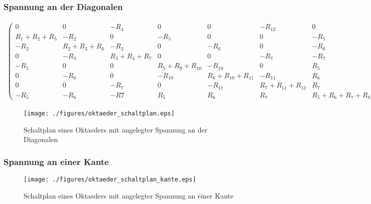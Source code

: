 \documentclass[10pt,a4paper]{article}
\begin{document}
\begin{landscape}
\subsubsection{Spannung an der Diagonalen}
\begin{align}
\begin{pmatrix}
	0 & 0 & -R_4 & 0 & 0 & -R_{12} & 0 & R_4 + R_{12} \\
	R_1 + R_2 + R_5 & -R_2 & 0 & -R_5 & 0 & 0 &-R_5 & 0 \\
	-R_2 & R_2 + R_3 + R_6 & -R_3 & 0 & -R_6 & 0 & -R_6 & 0 \\
	0 & -R_3 & R_3 + R_4 + R_7 & 0 & 0 & -R_7 & -R_7 & -R_4 \\
	-R_5 & 0 & 0 & R_5 + R_9 + R_{10} & -R_{10} & 0 & R_5 & 0 \\
	0 & -R_6 & 0 & -R_{10} & R_6 + R_{10} + R_{11} & -R_{11} & R_6 & 0 \\
	0 & 0 & -R_7 & 0 & -R_{11} & R_7 + R_{11} + R_{12} & R_7 & -R_{12} \\
	-R_5 & -R_6 & -R7 & R_5 & R_6 & R_7 & R_5 + R_6 + R_7 + R_8 & 0
\end{pmatrix}
\begin{pmatrix}
I_1\\ I_2\\ I_3\\I_4\\I_5\\I_6\\I_7\\I_{ges}
\end{pmatrix}
=
\begin{pmatrix}
U\\0\\0\\0\\0\\0\\0\\0
\end{pmatrix}
\label{eqn:oktaeder_ganz}
\end{align}
\begin{figure}[htbp!]
\centering
\texttt{[image: ./figures/oktaeder\_schaltplan.eps]}
\caption{Schaltplan eines Oktaeders mit angelegter Spannung an der Diagonalen}
\label{fig:oktaeder_schaltplan}
\end{figure}
\thispagestyle{empty}
\subsubsection{Spannung an einer Kante}
\begin{figure}[htbp!]
\centering
\texttt{[image: ./figures/oktaeder\_schaltplan\_kante.eps]}
\caption{Schaltplan eines Oktaeders mit angelegter Spannung an einer Kante}
\label{fig:oktaeder_schaltplan_kante}
\end{figure}
\end{landscape}
\end{document}
